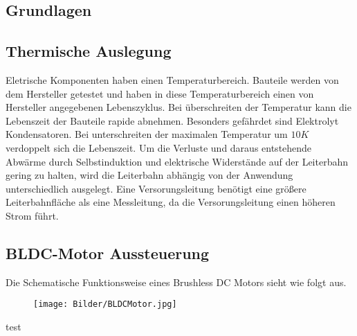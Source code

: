 \documentclass[10pt,a4paper,oneside,abstracton]{scrartcl}
\begin{document}
	
	\begin{multicols}{2}
		\section{Grundlagen}
		\subsection{Thermische Auslegung}
		Eletrische Komponenten haben einen Temperaturbereich. 
		Bauteile werden von dem Hersteller getestet und haben in diese Temperaturbereich einen von Hersteller angegebenen Lebenszyklus. 
		Bei überschreiten der Temperatur kann die Lebenszeit der Bauteile rapide abnehmen. 
		Besonders gefährdet sind Elektrolyt Kondensatoren. 
		Bei unterschreiten der maximalen Temperatur um $ 10K $ verdoppelt sich die Lebenszeit. 
		\newline
		Um die Verluste und daraus entstehende Abwärme durch Selbstinduktion und elektrische Widerstände  auf der Leiterbahn gering zu halten,
		wird die Leiterbahn abhängig von der Anwendung unterschiedlich ausgelegt.
		\newline
		Eine Versorungsleitung benötigt eine größere Leiterbahnfläche als eine Messleitung, da die Versorungsleitung einen höheren Strom führt. 
		
		
		\subsection{BLDC-Motor Aussteuerung}
		
		Die Schematische Funktionsweise eines Brushless DC Motors sieht wie folgt aus.
		
		\begin{figure}
			\texttt{[image: Bilder/BLDCMotor.jpg]}
		\end{figure}
		
		
		test
		

\end{multicols}
\end{document}
